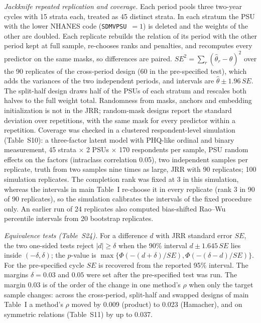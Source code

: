 \documentclass[journal]{IEEEtran}
\begin{document}
\emph{Jackknife repeated replication and coverage.} Each period pools three two-year cycles with 15 strata each, treated as 45 distinct strata. In each stratum the PSU with the lower NHANES code (\texttt{SDMVPSU}~$=1$) is deleted and the weights of the other are doubled. Each replicate rebuilds the relation of its period with the other period kept at full sample, re-chooses ranks and penalties, and recomputes every predictor on the same masks, so differences are paired. $SE^2=\sum_r(\hat\theta_r-\hat\theta)^2$ over the 90 replicates of the cross-period design (60 in the pre-specified test), which adds the variances of the two independent periods, and intervals are $\hat\theta\pm1.96\,SE$. The split-half design draws half of the PSUs of each stratum and rescales both halves to the full weight total. Randomness from masks, anchors and embedding initialization is not in the JRR; random-mask designs report the standard deviation over repetitions, with the same mask for every predictor within a repetition. Coverage was checked in a clustered respondent-level simulation (Table~S10): a three-factor latent model with PHQ-like ordinal and binary measurement, 45 strata $\times$ 2 PSUs $\times$ 170 respondents per sample, PSU random effects on the factors (intraclass correlation 0.05), two independent samples per replicate, truth from two samples nine times as large, JRR with 90 replicates; 100 simulation replicates. The completion rank was fixed at 3 in this simulation, whereas the intervals in main Table~I re-choose it in every replicate (rank 3 in 90 of 90 replicates), so the simulation calibrates the intervals of the fixed procedure only. An earlier run of 24 replicates also computed bias-shifted Rao--Wu percentile intervals from 20 bootstrap replicates.

\emph{Equivalence tests (Table~S24).} For a difference $d$ with JRR standard error $SE$, the two one-sided tests reject $|d|\ge\delta$ when the 90\% interval $d\pm1.645\,SE$ lies inside $(-\delta,\delta)$; the $p$-value is $\max\{\Phi(-(d+\delta)/SE),\Phi(-(\delta-d)/SE)\}$. For the pre-specified cycle $SE$ is recovered from the reported 95\% interval. The margins $\delta=0.03$ and $0.05$ were set after the pre-specified test was run. The margin 0.03 is of the order of the change in one method's $\rho$ when only the target sample changes: across the cross-period, split-half and swapped designs of main Table~I a method's $\rho$ moved by 0.009 (product) to 0.023 (Hamacher), and on symmetric relations (Table~S11) by up to 0.037.
\end{document}
